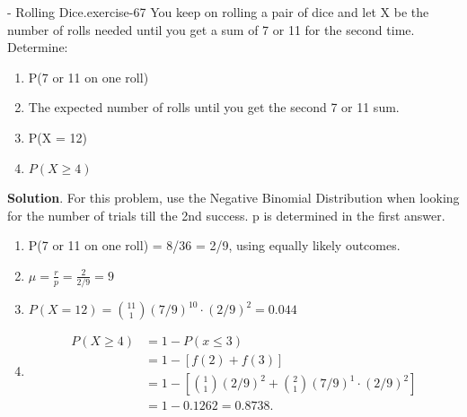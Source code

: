 \documentclass[10pt,]{book}
\numberwithin{equation}{section}
\begin{document}
\begin{inlineexercise}{- Rolling Dice.}{exercise-67}%
\hypertarget{p-1007}{}%
You keep on rolling a pair of dice and let X be the number of rolls needed until you get a sum of 7 or 11 for the second time. Determine: \leavevmode%
\begin{enumerate}
\item\hypertarget{li-266}{}P(7 or 11 on one roll)%
\item\hypertarget{li-267}{}The expected number of rolls until you get the second 7 or 11 sum.%
\item\hypertarget{li-268}{}P(X = 12)%
\item\hypertarget{li-269}{}\(P(X \ge 4)\)%
\end{enumerate}
%
\textbf{Solution}.\quad%
\hypertarget{p-1008}{}%
For this problem, use the Negative Binomial Distribution when looking for the number of trials till the 2nd success. p is determined in the first answer. \leavevmode%
\begin{enumerate}
\item\hypertarget{li-270}{}P(7 or 11 on one roll) = 8/36 = 2/9, using equally likely outcomes.%
\item\hypertarget{li-271}{}\(\mu = \frac{r}{p} = \frac{2}{2/9} = 9\)%
\item\hypertarget{li-272}{}\(P( X = 12) = \binom{11}{1} (7/9)^10 \cdot (2/9)^2 = 0.044\)%
\item\hypertarget{li-273}{}%
\begin{align*}
P(X \ge 4) & = 1- P(x \le 3) \\
& = 1 - [ f(2) + f(3) ]\\
& = 1 - \left[ \binom{1}{1} (2/9)^2 + \binom{2}{1} (7/9)^1 \cdot (2/9)^2 \right ]\\
& = 1 - 0.1262 = 0.8738.
\end{align*}
%
\end{enumerate}
%
\end{inlineexercise}
%
\par
\hypertarget{p-1009}{}%
\end{document}

